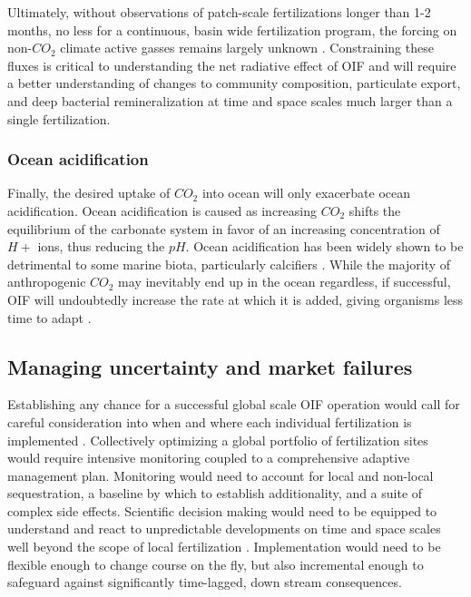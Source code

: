 Ultimately, without observations of patch-scale fertilizations longer than 1-2 months, no less for a continuous, basin wide fertilization program, the forcing on non-$CO_2$ climate active gasses remains largely unknown \parencite{LawPredictingmonitoringeffects2008}. Constraining these fluxes is critical to understanding the net radiative effect of OIF and will require a better understanding of changes to community composition, particulate export, and deep bacterial remineralization at time and space scales much larger than a single fertilization.  

\subsubsection{Ocean acidification} 

Finally, the desired uptake of $CO_2$ into ocean will only exacerbate ocean acidification. Ocean acidification is caused as increasing $CO_2$ shifts the equilibrium of the carbonate system in favor of an increasing concentration of $H+$ ions, thus reducing the $pH$. Ocean acidification has been widely shown to be detrimental to some marine biota, particularly calcifiers \parencite{DoneyOceanAcidificationOther2009}. While the majority of anthropogenic $CO_2$ may inevitably end up in the ocean regardless, if successful, OIF will undoubtedly increase the rate at which it is added, giving organisms less time to adapt \parencite{DenmanClimatechangeocean2008}.  


\subsection{Managing uncertainty and market failures} 

Establishing any chance for a successful global scale OIF operation would call for careful consideration into when and where each individual fertilization is implemented \parencite{YoonOceanIronFertilization2016, BuesselerOceanIronFertilization2008}. Collectively optimizing a global portfolio of fertilization sites would require intensive monitoring coupled to a comprehensive adaptive management plan. Monitoring would need to account for local and non-local sequestration, a baseline by which to establish additionality, and a suite of complex side effects. Scientific decision making would need to be equipped to understand and react to unpredictable developments on time and space scales well beyond the scope of local fertilization \parencite{GnanadesikanEffectspatchyocean2003}. Implementation would need to be flexible enough to change course on the fly, but also incremental enough to safeguard against significantly time-lagged, down stream consequences. 

